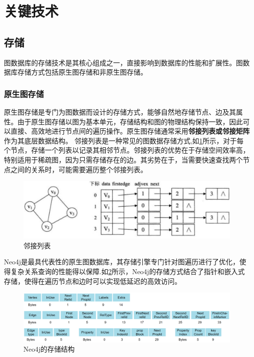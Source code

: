 \section{关键技术}

\subsection{存储}

图数据库的存储技术是其核心组成之一，直接影响到数据库的性能和扩展性。图数据库存储方式包括原生图存储和非原生图存储。

\subsubsection{原生图存储}

原生图存储是专门为图数据而设计的存储方式，能够自然地存储节点、边及其属性。由于原生图存储以图为基本单元，存储结构和图的物理结构保持一致，因此可以直接、高效地进行节点间的遍历操作。原生图存储通常采用\textbf{邻接列表或邻接矩阵}作为其底层数据结构。
邻接列表是一种常见的图数据存储方式,如\cref{fig:adjacency-list}所示，对于每个节点，存储一个列表以记录其相邻节点。邻接列表的优势在于存储空间效率高，特别适用于稀疏图，因为只需存储存在的边。其劣势在于，当需要快速查找两个节点之间的关系时，可能需要遍历整个邻接列表。\begin{figure}[H]
	\centering
	\includegraphics[width=1\textwidth]{images/11.png}
	\caption{邻接列表}
	\label{fig:adjacency-list}
\end{figure}

Neo4j是最具代表性的原生图数据库，其存储引擎专门针对图遍历进行了优化，使得复杂关系查询的性能得以保障.如\cref{fig:neo4j}所示，Neo4j的存储方式结合了指针和嵌入式存储，使得在遍历节点和边时可以实现低延迟的高效访问。\begin{figure}[H]
	\centering
	\includegraphics[width=1\textwidth]{images/4.png}
	\caption{Neo4j的存储结构}
	\label{fig:neo4j}
\end{figure}

